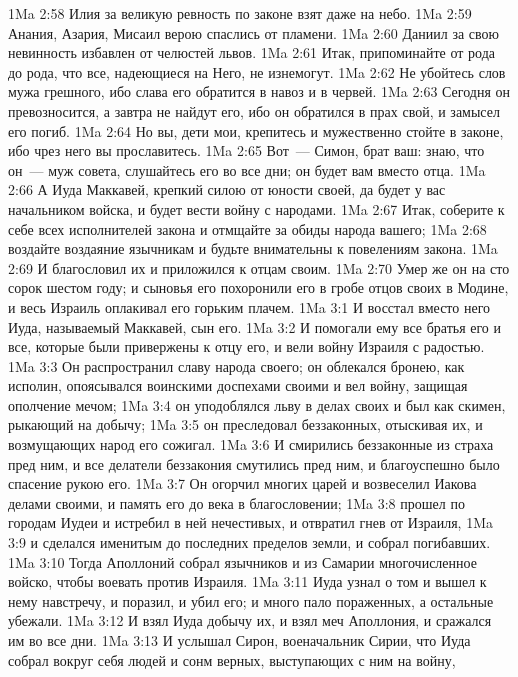 \vs 1Ma 2:58 Илия за великую ревность по законе взят даже на небо.
\vs 1Ma 2:59 Анания, Азария, Мисаил верою спаслись от пламени.
\vs 1Ma 2:60 Даниил за свою невинность избавлен от челюстей львов.
\vs 1Ma 2:61 Итак, припоминайте от рода до рода, что все, надеющиеся на Него, не изнемогут.
\vs 1Ma 2:62 Не убойтесь слов мужа грешного, ибо слава его обратится в навоз и в червей.
\vs 1Ma 2:63 Сегодня он превозносится, а завтра не найдут его, ибо он обратился в прах свой, и замысел его погиб.
\vs 1Ma 2:64 Но вы, дети мои, крепитесь и мужественно стойте в законе, ибо чрез него вы прославитесь.
\vs 1Ma 2:65 Вот~--- Симон, брат ваш: знаю, что он~--- муж совета, слушайтесь его во все дни; он будет вам вместо отца.
\vs 1Ma 2:66 А Иуда Маккавей, крепкий силою от юности своей, да будет у вас начальником войска, и будет вести войну с народами.
\vs 1Ma 2:67 Итак, соберите к себе всех исполнителей закона и отмщайте за обиды народа вашего;
\vs 1Ma 2:68 воздайте воздаяние язычникам и будьте внимательны к повелениям закона.
\vs 1Ma 2:69 И благословил их и приложился к отцам своим.
\vs 1Ma 2:70 Умер же он на сто сорок шестом году; и сыновья его похоронили его в гробе отцов своих в Модине, и весь Израиль оплакивал его горьким плачем.
\vs 1Ma 3:1 И восстал вместо него Иуда, называемый Маккавей, сын его.
\vs 1Ma 3:2 И помогали ему все братья его и все, которые были привержены к отцу его, и вели войну Израиля с радостью.
\vs 1Ma 3:3 Он распространил славу народа своего; он облекался бронею, как исполин, опоясывался воинскими доспехами своими и вел войну, защищая ополчение мечом;
\vs 1Ma 3:4 он уподоблялся льву в делах своих и был как скимен, рыкающий на добычу;
\vs 1Ma 3:5 он преследовал беззаконных, отыскивая их, и возмущающих народ его сожигал.
\vs 1Ma 3:6 И смирились беззаконные из страха пред ним, и все делатели беззакония смутились пред ним, и благоуспешно было спасение рукою его.
\vs 1Ma 3:7 Он огорчил многих царей и возвеселил Иакова делами своими, и память его до века в благословении;
\vs 1Ma 3:8 прошел по городам Иудеи и истребил в ней нечестивых, и отвратил гнев от Израиля,
\vs 1Ma 3:9 и сделался именитым до последних пределов земли, и собрал погибавших.
\rsbpar\vs 1Ma 3:10 Тогда Аполлоний собрал язычников и из Самарии многочисленное войско, чтобы воевать против Израиля.
\vs 1Ma 3:11 Иуда узнал о том и вышел к нему навстречу, и поразил, и убил его; и много пало пораженных, а остальные убежали.
\vs 1Ma 3:12 И взял Иуда добычу их, и взял меч Аполлония, и сражался им во все дни.
\rsbpar\vs 1Ma 3:13 И услышал Сирон, военачальник Сирии, что Иуда собрал вокруг себя людей и сонм верных, выступающих с ним на войну,
